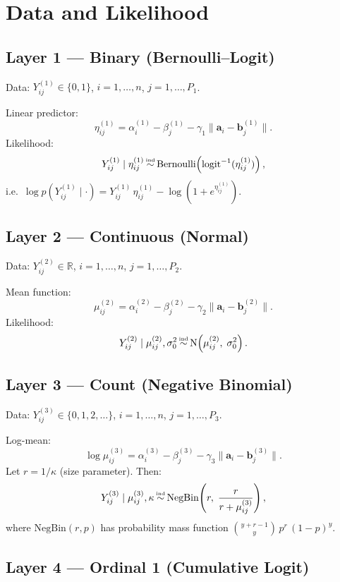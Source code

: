 \documentclass[A4paper,11pt]{article}
\newcommand{\msim}{\mathop{\rm \sim}}
\newcommand{\ind}{\msim\limits^{\mbox{\tiny ind}}}
\begin{document}
\section{Data and Likelihood}

\subsection{Layer 1 --- Binary (Bernoulli--Logit)}

Data: $Y^{(1)}_{ij} \in \{0,1\}$, \; $i=1,\dots,n$, \; $j=1,\dots,P_1$.

Linear predictor:
\[
  \eta^{(1)}_{ij} = \alpha^{(1)}_i - \beta^{(1)}_j - \gamma_1 \|\bm{a}_i - \bm{b}^{(1)}_j\|.
\]
Likelihood:
\[
  Y^{(1)}_{ij} \mid \eta^{(1)}_{ij} \ind \mathrm{Bernoulli}\!\left(\mathrm{logit}^{-1}(\eta^{(1)}_{ij})\right),
\]
i.e.\ $\log p(Y^{(1)}_{ij}\mid\cdot) = Y^{(1)}_{ij}\,\eta^{(1)}_{ij} - \log(1+e^{\eta^{(1)}_{ij}})$.

\subsection{Layer 2 --- Continuous (Normal)}

Data: $Y^{(2)}_{ij} \in \mathbb{R}$, \; $i=1,\dots,n$, \; $j=1,\dots,P_2$.

Mean function:
\[
  \mu^{(2)}_{ij} = \alpha^{(2)}_i - \beta^{(2)}_j - \gamma_2 \|\bm{a}_i - \bm{b}^{(2)}_j\|.
\]
Likelihood:
\[
  Y^{(2)}_{ij} \mid \mu^{(2)}_{ij}, \sigma^2_0 \ind \mathrm{N}\!\left(\mu^{(2)}_{ij},\; \sigma^2_0\right).
\]

\subsection{Layer 3 --- Count (Negative Binomial)}

Data: $Y^{(3)}_{ij} \in \{0,1,2,\dots\}$, \; $i=1,\dots,n$, \; $j=1,\dots,P_3$.

Log-mean:
\[
  \log\mu^{(3)}_{ij} = \alpha^{(3)}_i - \beta^{(3)}_j - \gamma_3 \|\bm{a}_i - \bm{b}^{(3)}_j\|.
\]
Let $r = 1/\kappa$ (size parameter). Then:
\[
  Y^{(3)}_{ij} \mid \mu^{(3)}_{ij}, \kappa \ind \mathrm{NegBin}\!\left(r,\; \frac{r}{r + \mu^{(3)}_{ij}}\right),
\]
where $\mathrm{NegBin}(r,p)$ has probability mass function
$\binom{y+r-1}{y}\,p^r\,(1-p)^y$.

\subsection{Layer 4 --- Ordinal 1 (Cumulative Logit)}
\end{document}
